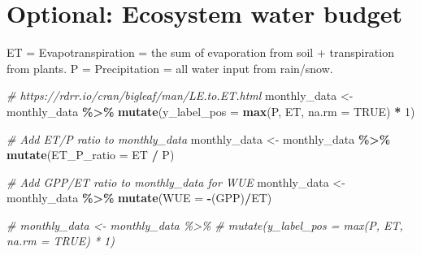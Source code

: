 \documentclass[
]{article}
\newenvironment{Shaded}{\begin{snugshade}}{\end{snugshade}}
\newcommand{\AttributeTok}[1]{\textcolor[rgb]{0.13,0.29,0.53}{#1}}
\newcommand{\CommentTok}[1]{\textcolor[rgb]{0.56,0.35,0.01}{\textit{#1}}}
\newcommand{\ConstantTok}[1]{\textcolor[rgb]{0.56,0.35,0.01}{#1}}
\newcommand{\DecValTok}[1]{\textcolor[rgb]{0.00,0.00,0.81}{#1}}
\newcommand{\FunctionTok}[1]{\textcolor[rgb]{0.13,0.29,0.53}{\textbf{#1}}}
\newcommand{\NormalTok}[1]{#1}
\newcommand{\OtherTok}[1]{\textcolor[rgb]{0.56,0.35,0.01}{#1}}
\newcommand{\SpecialCharTok}[1]{\textcolor[rgb]{0.81,0.36,0.00}{\textbf{#1}}}
\begin{document}
\section{Optional: Ecosystem water
budget}\label{optional-ecosystem-water-budget}

ET = Evapotranspiration = the sum of evaporation from soil +
transpiration from plants. P = Precipitation = all water input from
rain/snow.

\begin{Shaded}
\begin{Highlighting}[]
\CommentTok{\# https://rdrr.io/cran/bigleaf/man/LE.to.ET.html}
\NormalTok{monthly\_data }\OtherTok{\textless{}{-}}\NormalTok{ monthly\_data }\SpecialCharTok{\%\textgreater{}\%}
  \FunctionTok{mutate}\NormalTok{(}\AttributeTok{y\_label\_pos =} \FunctionTok{max}\NormalTok{(P, ET, }\AttributeTok{na.rm =} \ConstantTok{TRUE}\NormalTok{) }\SpecialCharTok{*} \DecValTok{1}\NormalTok{)}

\CommentTok{\# Add ET/P ratio to monthly\_data}
\NormalTok{monthly\_data }\OtherTok{\textless{}{-}}\NormalTok{ monthly\_data }\SpecialCharTok{\%\textgreater{}\%}
  \FunctionTok{mutate}\NormalTok{(}\AttributeTok{ET\_P\_ratio =}\NormalTok{ ET }\SpecialCharTok{/}\NormalTok{ P)}

\CommentTok{\# Add GPP/ET ratio to monthly\_data for WUE}
\NormalTok{monthly\_data }\OtherTok{\textless{}{-}}\NormalTok{ monthly\_data }\SpecialCharTok{\%\textgreater{}\%}
  \FunctionTok{mutate}\NormalTok{(}\AttributeTok{WUE =} \SpecialCharTok{{-}}\NormalTok{(GPP)}\SpecialCharTok{/}\NormalTok{ET)}

\CommentTok{\# monthly\_data \textless{}{-} monthly\_data \%\textgreater{}\%}
\CommentTok{\#   mutate(y\_label\_pos = max(P, ET, na.rm = TRUE) * 1)}


\end{Highlighting}
\end{Shaded}
\end{document}
